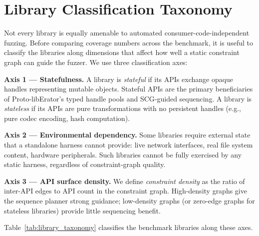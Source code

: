 
\section{Library Classification Taxonomy}
\label{sec:eval_taxonomy}

Not every library is equally amenable to automated consumer-code-independent fuzzing. Before comparing coverage numbers across the benchmark, it is useful to classify the libraries along dimensions that affect how well a static constraint graph can guide the fuzzer. We use three classification axes:

\textbf{Axis 1 — Statefulness.} A library is \emph{stateful} if its APIs exchange opaque handles representing mutable objects. Stateful APIs are the primary beneficiaries of Proto-libErator's typed handle pools and SCG-guided sequencing. A library is \emph{stateless} if its APIs are pure transformations with no persistent handles (e.g., pure codec encoding, hash computation).

\textbf{Axis 2 — Environmental dependency.} Some libraries require external state that a standalone harness cannot provide: live network interfaces, real file system content, hardware peripherals. Such libraries cannot be fully exercised by any static harness, regardless of constraint-graph quality.

\textbf{Axis 3 — API surface density.} We define \emph{constraint density} as the ratio of inter-API edges to API count in the constraint graph. High-density graphs give the sequence planner strong guidance; low-density graphs (or zero-edge graphs for stateless libraries) provide little sequencing benefit.

Table~\ref{tab:library_taxonomy} classifies the benchmark libraries along these axes.

